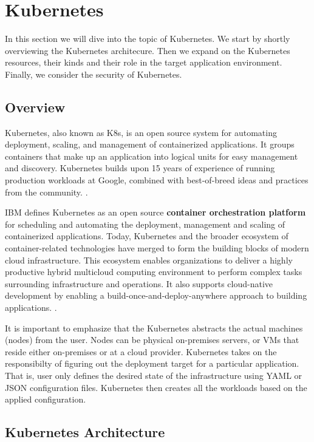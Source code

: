 \section{Kubernetes}

In this section we will dive into the topic of Kubernetes. We start by shortly overviewing the Kubernetes architecure. Then we expand on the Kubernetes resources, their kinds and their role in the target application environment. Finally, we consider the security of Kubernetes.

\subsection{Overview}

Kubernetes, also known as K8s, is an open source system for automating deployment, scaling, and management of containerized applications. It groups containers that make up an application into logical units for easy management and discovery. Kubernetes builds upon 15 years of experience of running production workloads at Google, combined with best-of-breed ideas and practices from the community. \cite{kubernetes}.

IBM defines Kubernetes as an open source \textbf{container orchestration platform} for scheduling and automating the deployment, management and scaling of containerized applications. Today, Kubernetes and the broader ecosystem of container-related technologies have merged to form the building blocks of modern cloud infrastructure. This ecosystem enables organizations to deliver a highly productive hybrid multicloud computing environment to perform complex tasks surrounding infrastructure and operations. It also supports cloud-native development by enabling a build-once-and-deploy-anywhere approach to building applications. \cite{ibm-kubernetes}.

It is important to emphasize that the Kubernetes abstracts the actual machines (nodes) from the user. Nodes can be physical on-premises servers, or VMs that reside either on-premises or at a cloud provider. Kubernetes takes on the responsibilty of figuring out the deployment target for a particular application. That is, user only defines the desired state of the infrastructure using YAML or JSON configuration files. Kubernetes then creates all the workloads based on the applied configuration.

\subsection{Kubernetes Architecture}

